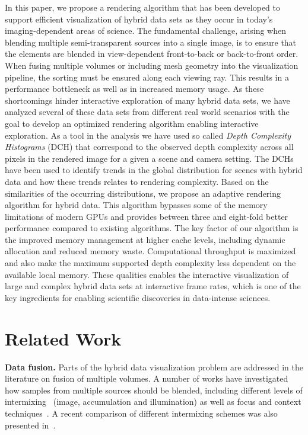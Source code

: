 \documentclass{egpubl}
\newcommand{\dch}{DCH}
\begin{document}
In this paper, we propose a rendering algorithm that has been developed to support efficient visualization of hybrid data sets as they occur in today's imaging-dependent areas of science. 
The fundamental challenge, arising when blending multiple semi-transparent sources into a single image, is to ensure that the elements are blended in view-dependent front-to-back or back-to-front order. 
When fusing multiple volumes or including mesh geometry into the visualization pipeline, the sorting must be ensured along each viewing ray.
This results in a performance bottleneck as well as in increased memory usage. 
As these shortcomings hinder interactive exploration of many hybrid data sets, we have analyzed several of these data sets from different real world scenarios with the goal to develop an optimized rendering algorithm enabling interactive exploration. 
As a tool in the analysis we have used so called \emph{Depth Complexity Histograms} (\dch) that correspond to the observed depth complexity across all pixels in the rendered image for a given a scene and camera setting. 
The \dch{}s have been used to identify trends in the global distribution for scenes with hybrid data and how these trends relates to rendering complexity. 
Based on the similarities of the occurring distributions, we propose an adaptive rendering algorithm for hybrid data.
This algorithm bypasses some of the memory limitations of modern GPUs and provides between three and eight-fold better performance compared to existing algorithms. %
The key factor of our algorithm is the improved memory management at higher cache levels, including dynamic allocation and reduced memory waste. 
Computational throughput is maximized and also make the maximum supported depth complexity less dependent on the available local memory. 
These qualities enables the interactive visualization of large and complex hybrid data sets at interactive frame rates, which is one of the key ingredients for enabling scientific discoveries in data-intense sciences.


\section{Related Work}
\label{sec:related-work}

\noindent\textbf{Data fusion.} 
%
Parts of the hybrid data visualization problem are addressed in the literature on fusion of multiple volumes. 
A number of works have investigated how samples from multiple sources should be blended, including different levels of intermixing~\cite{cai99intermixing} (image, accumulation and illumination) as well as focus and context techniques~\cite{viola-2007-ort}. 
A recent comparison of different intermixing schemes was also presented in~\cite{Schubert2011}. 
\end{document}
